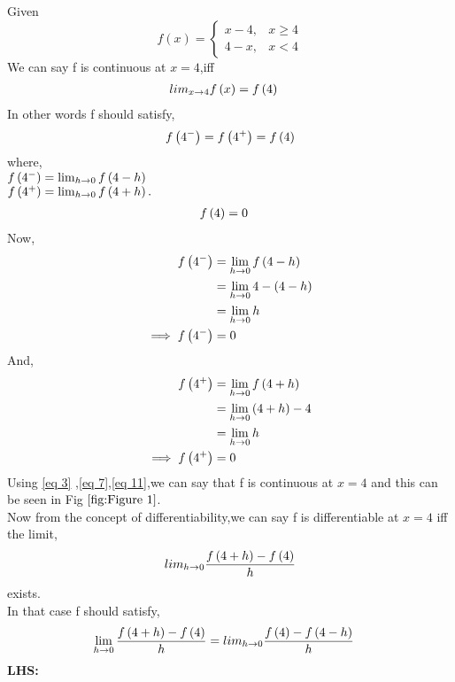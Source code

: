 \documentclass[journal,12pt,twocolumn]{IEEEtran}
\begin{document}
  Given  
            \begin{equation*} 
                 f(x)  = \begin{cases}
                              x - 4,  & x \geq 4 \\
                              4 - x , & x  <  4
                           \end{cases}
            \end{equation*}  
   We can say f is continuous at $x = 4$,iff 
            \begin{align}
                 lim_{x \to 4}f\left(x\right) &= f\left(4\right)
            \end{align}
    In other words f should satisfy,
            \begin{align}
                 f\left(4^-\right) =f\left(4^+\right) =f\left(4\right) 
            \end{align}
    where,\\ 
        $f\left(4^-\right) =  \lim_{h\to0}f\left(4-h\right)$\\
        $f\left(4^+\right) = \lim_{h\to0}f\left(4+h\right).$
            \begin{align}
                 f\left(4\right) &= 0\label{eq 3}
            \end{align}
    Now,
            \begin{align}
                 f\left(4^-\right) &= \lim_{h\to0}f\left(4-h\right)\\
                             &= \lim_{h\to0} 4 - \left(4-h\right)\\
                             &= \lim_{h\to0} h\\
                 \implies f\left(4^-\right) &= 0\label{eq 7}
            \end{align}
    And,
            \begin{align}
                 f\left(4^+\right) &= \lim_{h\to0}f\left(4+h\right)\\
                             &= \lim_{h\to0} \left(4+h\right)-4\\
                             &= \lim_{h\to0} h \\
                 \implies f\left(4^+\right) &= 0\label{eq 11}
            \end{align}
    Using \eqref{eq 3} ,\eqref{eq 7},\eqref{eq 11},we can say that f is continuous at $ x = 4 $ and this can be seen in Fig $\ref{fig:Figure 1}$.\\
    Now from the concept of differentiability,we can say f is differentiable at $ x = 4 $ iff the limit,
             \[
                lim_{h \to 0}\frac{f\left(4 + h\right) - f\left(4\right)}{h}
             \] exists.\\
    In that case f should satisfy,
            \begin{align}
                 \lim_{h \to 0}\frac{f\brak{4 + h} - f\brak{4}}{h}  &=  lim_{h \to 0}\frac{f\brak{4} - f\brak{4-h}}{h}\label{eq 12} %
            \end{align}
 \textbf{LHS:}
\end{document}

